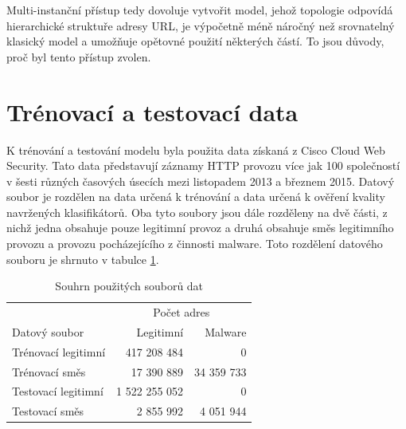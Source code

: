 Multi-instanční přístup tedy dovoluje vytvořit model, jehož topologie odpovídá hierarchické struktuře adresy URL, je výpočetně méně náročný než srovnatelný klasický model a umožňuje opětovné použití některých částí. To jsou důvody, proč byl tento přístup zvolen.

\section{Trénovací a testovací data}\label{dataset}
K trénování a testování modelu byla použita data získaná z Cisco Cloud Web Security. Tato data představují záznamy HTTP provozu více jak 100 společností v šesti různých časových úsecích mezi listopadem 2013 a březnem 2015. Datový soubor je rozdělen na data určená k trénování a data určená k ověření kvality navržených klasifikátorů. Oba tyto soubory jsou dále rozděleny na dvě části, z nichž jedna obsahuje pouze legitimní provoz a druhá obsahuje směs legitimního provozu a provozu pocházejícího z činnosti malware. Toto rozdělení datového souboru je shrnuto v tabulce \ref{dataset_table}.

\begin{table}[h]
	\caption{Souhrn použitých souborů dat}\label{dataset_table}
	\centering
	\begin{tabular}{lrr}
		\toprule
		\null & \multicolumn{2}{c}{Počet adres} \\
		\cmidrule(l){2-3}
		Datový soubor & Legitimní & Malware \\
		\midrule
		Trénovací legitimní & 417 208 484 & 0 \\
		Trénovací směs & 17 390 889 & 34 359 733 \\
		Testovací legitimní & 1 522 255 052 & 0 \\
		Testovací směs & 2 855 992 & 4 051 944 \\
		\bottomrule
	\end{tabular}
\end{table}
